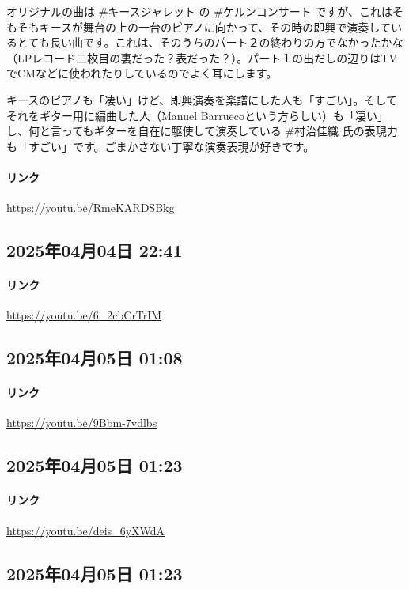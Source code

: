 オリジナルの曲は \#キースジャレット の \#ケルンコンサート ですが、これはそもそもキースが舞台の上の一台のピアノに向かって、その時の即興で演奏しているとても長い曲です。これは、そのうちのパート２の終わりの方でなかったかな（LPレコード二枚目の裏だった？表だった？）。パート１の出だしの辺りはTVでCMなどに使われたりしているのでよく耳にします。

キースのピアノも「凄い」けど、即興演奏を楽譜にした人も「すごい」。そしてそれをギター用に編曲した人（Manuel Barruecoという方らしい）も「凄い」し、何と言ってもギターを自在に駆使して演奏している \#村治佳織 氏の表現力も「すごい」です。ごまかさない丁寧な演奏表現が好きです。

\paragraph{リンク}
\url{https://youtu.be/RmeKARDSBkg}

\subsection*{2025年04月04日 22:41}

\paragraph{リンク}
\url{https://youtu.be/6_2cbCrTrIM}

\subsection*{2025年04月05日 01:08}

\paragraph{リンク}
\url{https://youtu.be/9Bbm-7vdlbs}

\subsection*{2025年04月05日 01:23}

\paragraph{リンク}
\url{https://youtu.be/deis_6yXWdA}

\subsection*{2025年04月05日 01:23}


